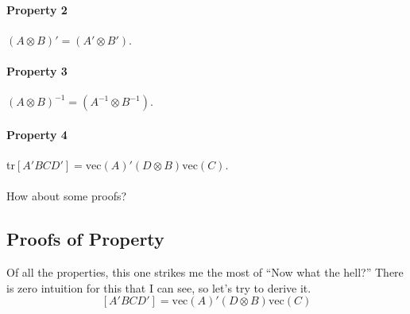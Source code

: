 \documentclass[a4paper,12pt]{scrartcl}
\begin{document}
\paragraph{Property 2} $(A\otimes B)' = (A' \otimes B')$.

\paragraph{Property 3} $(A\otimes B)^{-1} = (A^{-1} \otimes B^{-1})$.

\paragraph{Property 4} 
tr$\left[A'BCD'\right] = \text{vec}(A)' (D \otimes B) \text{vec}(C)$.
\\
\\
How about some proofs?


\newpage
\subsection{Proofs of Property}

Of all the properties, this one strikes me the most of 
``Now what the hell?''  There is zero intuition for this that
I can see, so let's try to derive it.
\begin{equation}
    \label{vecder}
    \left[A'BCD'\right] = \text{vec}(A)' (D \otimes B)		 
	\text{vec}(C)
\end{equation}
\end{document}

